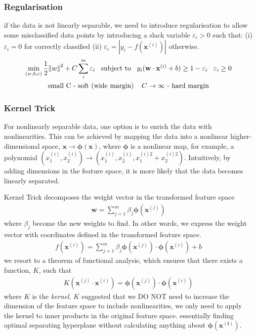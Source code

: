 \documentclass[a4paper,10pt]{article}
\begin{document}
\subsubsection{Regularisation}
if the data is not linearly separable, we need to introduce regularisation to allow some misclassified data points by introducing a slack variable $\varepsilon_i>0$ such that: (i) $\varepsilon_i=0$ for correctly classified (ii) $\varepsilon_i=\left| y_i-f(\mathbf{x}^{(i)})\right|$ otherwise. 
\begin{gather*}
    \min\limits_{(w,b,\varepsilon)}\frac{1}{2}{\lVert w \rVert}^2+C\sum_{i}^{m}\varepsilon_i\hspace*{0.3cm}\text{subject to}\hspace*{0.3cm}y_i(\mathbf{w}\cdot\mathbf{x}^{(i)}+b)\geq1-\varepsilon_i\hspace*{0.3cm}\varepsilon_i\geq0\\
    \text{small C - soft (wide margin)}\hspace*{0.4cm}C\rightarrow\infty\text{ - hard margin}
\end{gather*}

\subsubsection{Kernel Trick}
For nonlinearly separable data, one option is to enrich the data with nonlinearities. This can be achieved by mapping the data into a nonlinear higher-dimensional space, $\mathbf{x}\rightarrow\mathbf{\phi(x)}$, where $\mathbf{\phi}$ is a nonlinear map, for example, a polynomial $(x_1^{(i)},x_2^{(i)})\rightarrow(x_1^{(i)},x_2^{(i)},x_1^{(i)2}+x_2^{(i)2})$. Intuitively, by adding dimensions in the feature space, it is more likely that the data becomes linearly separated.\par 

Kernel Trick decomposes the weight vector in the transformed feature space
\begin{gather*}
    \mathbf{w} = \sum_{j=1}^{m}\beta_j\pmb{\phi}(\pmb{x}^{(j)})
\end{gather*}
where $\beta_j$ become the new weights to find. In other words, we express the weight vector with coordinates defined in the transformed feature space.
\begin{gather*}
    f(\pmb{x}^{(i)}) = \sum_{j=1}^{m}\beta_j\pmb{\phi}(\pmb{x}^{(j)})\cdot\pmb{\phi}(\pmb{x}^{(i)})+b 
\end{gather*}
we resort to a theorem of functional analysis, which ensures that there exists a function, $K$, such that
\begin{gather*}
    K(\pmb{x}^{(j)}\cdot\pmb{x}^{(i)}) = \pmb{\phi}(\pmb{x}^{(j)})\cdot\pmb{\phi}(\pmb{x}^(i))
\end{gather*}
where $K$ is the \textit{kernel}. $K$ suggested that we DO NOT need to increase the dimension of the feature space to include nonlinearities, we only need to apply the kernel to inner products in the original feature space. essentially finding optimal separating hyperplane without calculating anything about $\pmb{\phi(x^{(i)})}$.\par 
\end{document}
